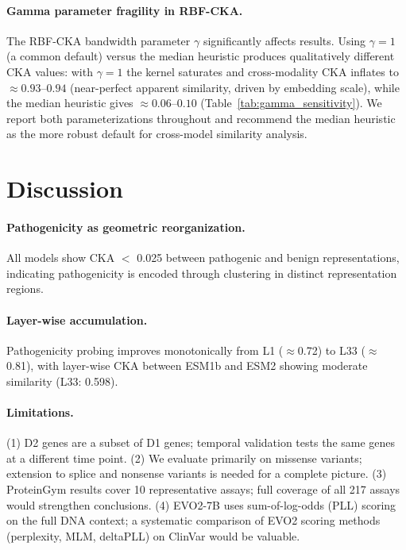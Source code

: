 \documentclass[9pt]{article}
\begin{document}
\paragraph{Gamma parameter fragility in RBF-CKA.} The RBF-CKA bandwidth parameter $\gamma$ significantly affects results. Using $\gamma = 1$ (a common default) versus the median heuristic produces qualitatively different CKA values: with $\gamma = 1$ the kernel saturates and cross-modality CKA inflates to $\approx 0.93$--$0.94$ (near-perfect apparent similarity, driven by embedding scale), while the median heuristic gives $\approx 0.06$--$0.10$ (Table~\ref{tab:gamma_sensitivity}). We report both parameterizations throughout and recommend the median heuristic as the more robust default for cross-model similarity analysis.

\section{Discussion}

\paragraph{Pathogenicity as geometric reorganization.} All models show CKA $<$ 0.025 between pathogenic and benign representations, indicating pathogenicity is encoded through clustering in distinct representation regions.

\paragraph{Layer-wise accumulation.} Pathogenicity probing improves monotonically from L1 ($\approx$0.72) to L33 ($\approx$0.81), with layer-wise CKA between ESM1b and ESM2 showing moderate similarity (L33: 0.598).

\paragraph{Limitations.} (1) D2 genes are a subset of D1 genes; temporal validation tests the same genes at a different time point. (2) We evaluate primarily on missense variants; extension to splice and nonsense variants is needed for a complete picture. (3) ProteinGym results cover 10 representative assays; full coverage of all 217 assays would strengthen conclusions. (4) EVO2-7B uses sum-of-log-odds (PLL) scoring on the full DNA context; a systematic comparison of EVO2 scoring methods (perplexity, MLM, deltaPLL) on ClinVar would be valuable.
\end{document}
